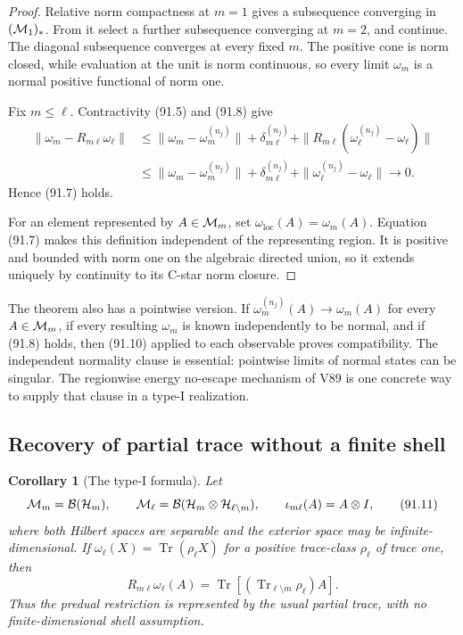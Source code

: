 \documentclass[11pt]{article}
\newtheorem{corollary}[theorem]{Corollary}
\theoremstyle{remark}
\begin{document}
\begin{proof}
Relative norm compactness at \(m=1\) gives a subsequence converging in
\(({\cal M}_1)_*\).  From it select a further subsequence converging
at \(m=2\), and continue.  The diagonal subsequence converges at
every fixed \(m\).  The positive cone is norm closed, while
evaluation at the unit is norm continuous, so every limit
\(\omega_m\) is a normal positive functional of norm one.

Fix \(m\leq\ell\).  Contractivity (91.5) and (91.8) give
\[
\begin{split}
 \|\omega_m-R_{m\ell}\omega_\ell\|
 &\leq
 \|\omega_m-\omega_m^{(n_j)}\|
 +\delta_{m\ell}^{(n_j)}
 +\|R_{m\ell}(\omega_\ell^{(n_j)}-\omega_\ell)\|\\
 &\leq
 \|\omega_m-\omega_m^{(n_j)}\|
 +\delta_{m\ell}^{(n_j)}
 +\|\omega_\ell^{(n_j)}-\omega_\ell\|
 \longrightarrow0.                                               \tag{91.10}
\end{split}
\]
Hence (91.7) holds.

For an element represented by \(A\in{\cal M}_m\), set
\(\omega_{\mathrm{loc}}(A)=\omega_m(A)\).  Equation (91.7) makes
this definition independent of the representing region.  It is
positive and bounded with norm one on the algebraic directed union,
so it extends uniquely by continuity to its C-star norm closure.
\end{proof}

The theorem also has a pointwise version.  If
\(\omega_m^{(n_j)}(A)\to\omega_m(A)\) for every \(A\in{\cal M}_m\),
if every resulting \(\omega_m\) is known independently to be normal,
and if (91.8) holds, then (91.10) applied to each observable proves
compatibility.  The independent normality clause is essential:
pointwise limits of normal states can be singular.  The regionwise
energy no-escape mechanism of V89 is one concrete way to supply that
clause in a type-I realization.

\subsection{Recovery of partial trace without a finite shell}

\begin{corollary}[The type-I formula]
\label{cor:v12v91-typei}
Let
\[
 {\cal M}_m={\cal B}({\cal H}_m),\qquad
 {\cal M}_\ell={\cal B}({\cal H}_m\otimes{\cal H}_{\ell\setminus m}),
 \qquad
 \iota_{m\ell}(A)=A\otimes I,                                    \tag{91.11}
\]
where both Hilbert spaces are separable and the exterior space may
be infinite-dimensional.  If
\(\omega_\ell(X)=\operatorname{Tr}(\rho_\ell X)\) for a positive
trace-class \(\rho_\ell\) of trace one, then
\[
 R_{m\ell}\omega_\ell(A)
 =\operatorname{Tr}\!\left[
   (\operatorname{Tr}_{\ell\setminus m}\rho_\ell)A\right].
                                                                    \tag{91.12}
\]
Thus the predual restriction is represented by the usual partial
trace, with no finite-dimensional shell assumption.
\end{corollary}
\end{document}
